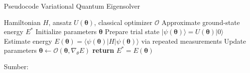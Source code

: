 \documentclass[aspectratio=169,xcolor=pdftex,dvipsnames,table]{beamer}
\begin{document}
\begin{frame}{Pseudocode Variational Quantum Eigensolver}
  \begin{algorithm}[H]
    \caption{Variational Quantum Eigensolver (VQE)}
    \begin{algorithmic}[1]
      \Require Hamiltonian $H$, ansatz $U(\boldsymbol{\theta})$, classical optimizer $\mathcal{O}$
      \Ensure Approximate ground-state energy $E^*$
      \State Initialize parameters $\boldsymbol{\theta}$
      \Repeat
        \State Prepare trial state $|\psi(\boldsymbol{\theta})\rangle = U(\boldsymbol{\theta}) |0\rangle$
        \State Estimate energy $E(\boldsymbol{\theta}) = \langle\psi(\boldsymbol{\theta})| H |\psi(\boldsymbol{\theta})\rangle$ via repeated measurements
        \State Update parameters $\boldsymbol{\theta} \leftarrow \mathcal{O}(\boldsymbol{\theta}, \nabla_{\theta} E)$
      \State \textbf{return} $E^* = E(\boldsymbol{\theta})$
    \end{algorithmic}
  \end{algorithm}
  \vspace{0.1cm}
  \centering \footnotesize Sumber: \cite{dixit_variational_2025}
\end{frame}
\end{document}
